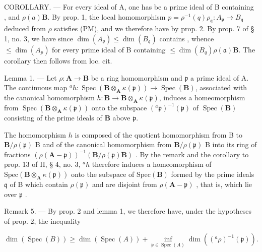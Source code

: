 COROLLARY. --- For every ideal  of A, one has 
 be a prime ideal of B containing 
, and \(\rho(a)\mathbf{B}\). By prop. 1, the local homomorphism \(p = \rho^{-1}(q)\)\(\rho_{\mathfrak{q}}: A_{\mathfrak{p}} \to B_{\mathfrak{q}}\) deduced from \(\rho\) satisfies (PM), and we therefore have  by prop. 2. By prop. 7 of § 1, no. 3, we have  since \(\dim(A_{\mathfrak{p}}) \leqslant \dim(B_{\mathfrak{q}})\) contains , whence \(\leqslant \dim(A_p)\) for every prime ideal  of B containing \(\leqslant \dim(B_q)\)\(\rho(\mathfrak{a})\mathbf{B}\). The corollary then follows from loc. cit.

Lemma 1. — Let \(\rho: \mathbf{A} \to \mathbf{B}\) be a ring homomorphism and \(\mathfrak{p}\) a prime ideal of A. The continuous map \(^{a}h: \operatorname{Spec}(\mathbf{B} \otimes_{\mathbf{A}} \kappa(\mathfrak{p})) \to \operatorname{Spec}(\mathbf{B})\), associated with the canonical homomorphism \(h:\mathbf{B}\to\mathbf{B}\otimes_{\mathbf{A}}\kappa(\mathfrak{p})\), induces a homeomorphism from \(\operatorname{Spec}(\mathbf{B}\otimes_{\mathbf{A}}\kappa(\mathfrak{p}))\) onto the subspace \((^{a}\mathfrak{p})^{-1}(\mathfrak{p})\) of \(\operatorname{Spec}(\mathbf{B})\) consisting of the prime ideals of \(\mathbf{B}\) above \(\mathfrak{p}\).

The homomorphism \(h\) is composed of the quotient homomorphism from B to \(\mathbf{B} / \rho(\mathfrak{p})\) B and of the canonical homomorphism from \(\mathbf{B} / \rho(\mathfrak{p})\) B into its ring of fractions \((\rho(\mathbf{A} - \mathfrak{p}))^{-1}(\mathbf{B} / \rho(\mathfrak{p}) \mathbf{B})\) . By the remark and the corollary to prop. 13 of II, § 4, no. 3, \(^a h\) therefore induces a homeomorphism of \(\text{Spec}(\mathbf{B} \otimes_{\mathbf{A}} \kappa(\mathfrak{p}))\) onto the subspace of \(\text{Spec}(\mathbf{B})\) formed by the prime ideals \(\mathfrak{q}\) of B which contain \(\rho(\mathfrak{p})\) and are disjoint from \(\rho(\mathbf{A} - \mathfrak{p})\) , that is, which lie over \(\mathfrak{p}\) .

Remark 5. --- By prop. 2 and lemma 1, we therefore have, under the hypotheses of prop. 2, the inequality

\[
\dim (\operatorname{Spec} (B)) \geqslant \dim (\operatorname{Spec} (A)) + \inf _ {\mathfrak {p} \in \operatorname{Spec} (A)} \dim \left(({}^{a}\rho)^{-1} (\mathfrak {p})\right).\tag{4}
\]

